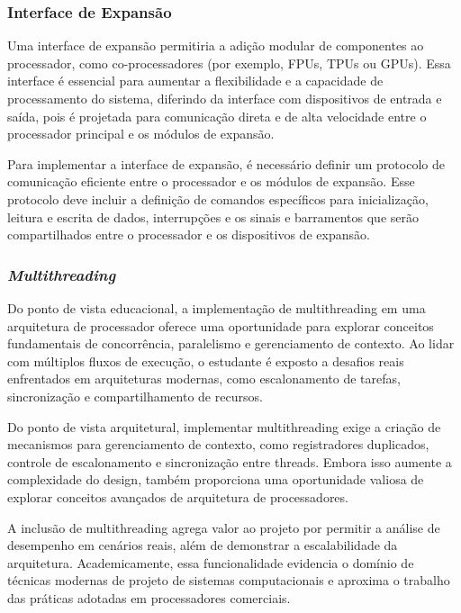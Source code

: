 \documentclass[
	12pt,				%
	openright,			%
	oneside,			%
	a4paper,			%
	english,			%
	french,				%
	spanish,			%
	brazil,				%
	]{abntex2}
\begin{document}
\subsubsection{Interface de Expansão}\label{recursos_expan}%

Uma interface de expansão permitiria a adição modular de componentes ao processador, como co-processadores (por exemplo, FPUs, TPUs ou GPUs). Essa interface é essencial para aumentar a flexibilidade e a capacidade de processamento do sistema, diferindo da interface com dispositivos de entrada e saída, pois é projetada para comunicação direta e de alta velocidade entre o processador principal e os módulos de expansão.

Para implementar a interface de expansão, é necessário definir um protocolo de comunicação eficiente entre o processador e os módulos de expansão. Esse protocolo deve incluir a definição de comandos específicos para inicialização, leitura e escrita de dados, interrupções e os sinais e barramentos que serão compartilhados entre o processador e os dispositivos de expansão.

\subsubsection{\textit{Multithreading}}\label{recursos_multithreading}%

Do ponto de vista educacional, a implementação de multithreading em uma arquitetura de processador oferece uma oportunidade para explorar conceitos fundamentais de concorrência, paralelismo e gerenciamento de contexto. Ao lidar com múltiplos fluxos de execução, o estudante é exposto a desafios reais enfrentados em arquiteturas modernas, como escalonamento de tarefas, sincronização e compartilhamento de recursos.

Do ponto de vista arquitetural, implementar multithreading exige a criação de mecanismos para gerenciamento de contexto, como registradores duplicados, controle de escalonamento e sincronização entre threads. Embora isso aumente a complexidade do design, também proporciona uma oportunidade valiosa de explorar conceitos avançados de arquitetura de processadores.

A inclusão de multithreading agrega valor ao projeto por permitir a análise de desempenho em cenários reais, além de demonstrar a escalabilidade da arquitetura. Academicamente, essa funcionalidade evidencia o domínio de técnicas modernas de projeto de sistemas computacionais e aproxima o trabalho das práticas adotadas em processadores comerciais.
\end{document}

